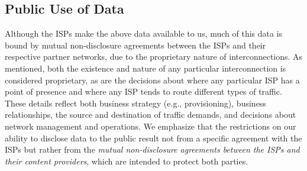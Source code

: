 \subsection{Public Use of Data}

Although the ISPs make the above data available to us, much of this data
is bound by mutual non-disclosure agreements between the ISPs and their
respective partner networks, due to the proprietary nature of
interconnections. As mentioned, both the existence and nature of any
particular interconnection is considered proprietary, as are the
decisions about where any particular ISP has a point of presence and
where any ISP tends to route different types of traffic.  These details
reflect both business strategy (e.g., provisioning), business
relationships, the source and destination of traffic demands, and
decisions about network management and operations.  We emphasize that
the restrictions on our ability to disclose data to the public result
not from a specific agreement with the ISPs but rather from the {\em
  mutual non-disclosure agreements between the ISPs and their content
  providers}, which are intended to protect both parties.


